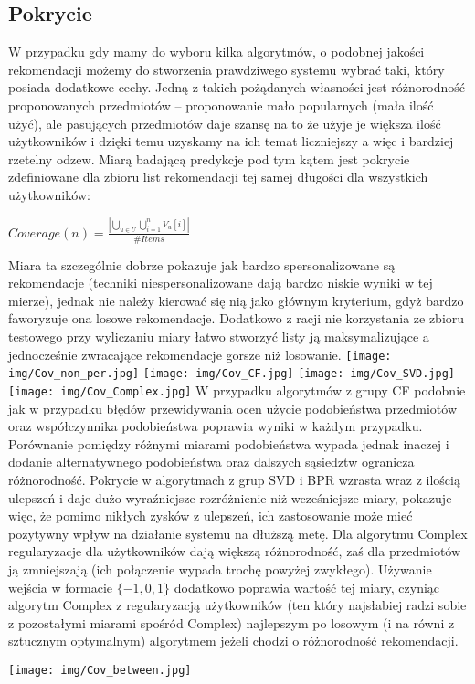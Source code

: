 \documentclass{pracamgr}
\begin{document}
   \subsection{Pokrycie}
    W przypadku gdy mamy do wyboru kilka algorytmów, o podobnej jakości rekomendacji możemy do stworzenia prawdziwego systemu wybrać taki,
    który posiada dodatkowe cechy. Jedną z takich pożądanych własności jest różnorodność proponowanych przedmiotów -- proponowanie mało popularnych
    (mała ilość użyć), ale pasujących przedmiotów daje szansę na to że użyje je większa ilość użytkowników i dzięki temu uzyskamy na ich temat liczniejszy
    a więc i bardziej rzetelny odzew. Miarą badającą predykcje pod tym kątem jest pokrycie zdefiniowane dla zbioru list rekomendacji tej samej
    długości dla wszystkich użytkowników:
    \begin{center}
     $Coverage(n)=\frac{|\bigcup\limits_{u\in U}\bigcup\limits_{i=1}^{n}V_u[i]|}{\#Items}$
    \end{center}
    Miara ta szczególnie dobrze pokazuje jak bardzo spersonalizowane są rekomendacje (techniki niespersonalizowane dają bardzo niskie wyniki w tej mierze),
    jednak nie należy kierować się nią jako głównym kryterium, gdyż bardzo faworyzuje ona losowe rekomendacje.
    Dodatkowo z racji nie korzystania ze zbioru testowego przy wyliczaniu miary łatwo stworzyć listy ją maksymalizujące
    a jednocześnie zwracające rekomendacje gorsze niż losowanie.\newline
    \texttt{[image: img/Cov\_non\_per.jpg]}
    \texttt{[image: img/Cov\_CF.jpg]}\newline
    \texttt{[image: img/Cov\_SVD.jpg]}
    \texttt{[image: img/Cov\_Complex.jpg]}\newline
    W przypadku algorytmów z grupy CF podobnie jak w przypadku błędów przewidywania ocen użycie podobieństwa przedmiotów oraz współczynnika podobieństwa
    poprawia wyniki w każdym przypadku. Porównanie pomiędzy różnymi miarami podobieństwa wypada jednak inaczej i dodanie alternatywnego podobieństwa oraz dalszych
    sąsiedztw ogranicza różnorodność.\newline
    Pokrycie w algorytmach z grup SVD i BPR wzrasta wraz z ilością ulepszeń i daje dużo wyraźniejsze rozróżnienie niż wcześniejsze miary, pokazuje więc, 
    że pomimo nikłych zysków z ulepszeń, ich zastosowanie może mieć pozytywny wpływ na działanie systemu na dłuższą metę.\newline
    Dla algorytmu Complex regularyzacje dla użytkowników dają większą różnorodność, zaś dla przedmiotów ją zmniejszają
    (ich połączenie wypada trochę powyżej zwykłego). Używanie wejścia w formacie $\{-1,0,1\}$ dodatkowo poprawia wartość tej miary,
    czyniąc algorytm Complex z regularyzacją użytkowników (ten który najsłabiej radzi sobie z pozostałymi miarami spośród Complex)
    najlepszym po losowym (i na równi z sztucznym optymalnym) algorytmem jeżeli chodzi o różnorodność rekomendacji.
    \begin{center}
    \texttt{[image: img/Cov\_between.jpg]}
    \end{center}
\end{document}
